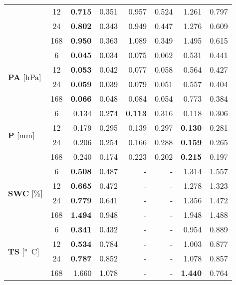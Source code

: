 \begin{table}
\begin{tabular}{p{2.1cm}c|rr|rr|rr}
 & 12 & \bfseries 0.715 & 0.351 & 0.957 & 0.524 & 1.261 & 0.797 \\
 & 24 & \bfseries 0.802 & 0.343 & 0.949 & 0.447 & 1.276 & 0.609 \\
 & 168 & \bfseries 0.950 & 0.363 & 1.089 & 0.349 & 1.495 & 0.615 \\
\cline{1-8}
\multirow[c]{4}{*}{{\textbf{PA} [\si{hPa}]}} & 6 & \bfseries 0.045 & 0.034 & 0.075 & 0.062 & 0.531 & 0.441 \\
 & 12 & \bfseries 0.053 & 0.042 & 0.077 & 0.058 & 0.564 & 0.427 \\
 & 24 & \bfseries 0.059 & 0.039 & 0.079 & 0.051 & 0.557 & 0.404 \\
 & 168 & \bfseries 0.066 & 0.048 & 0.084 & 0.054 & 0.773 & 0.384 \\
\cline{1-8}
\multirow[c]{4}{*}{{\textbf{P} [\si{mm}]}} & 6 & 0.134 & 0.274 & \bfseries 0.113 & 0.316 & 0.118 & 0.306 \\
 & 12 & 0.179 & 0.295 & 0.139 & 0.297 & \bfseries 0.130 & 0.281 \\
 & 24 & 0.206 & 0.254 & 0.166 & 0.288 & \bfseries 0.159 & 0.265 \\
 & 168 & 0.240 & 0.174 & 0.223 & 0.202 & \bfseries 0.215 & 0.197 \\
\cline{1-8}
\multirow[c]{4}{*}{{\textbf{SWC} [\si{\%}]}} & 6 & \bfseries 0.508 & 0.487 & - & - & 1.314 & 1.557 \\
 & 12 & \bfseries 0.665 & 0.472 & - & - & 1.278 & 1.323 \\
 & 24 & \bfseries 0.779 & 0.641 & - & - & 1.356 & 1.472 \\
 & 168 & \bfseries 1.494 & 0.948 & - & - & 1.948 & 1.488 \\
\cline{1-8}
\multirow[c]{4}{*}{{\textbf{TS} [\si{°C}]}} & 6 & \bfseries 0.341 & 0.432 & - & - & 0.954 & 0.889 \\
 & 12 & \bfseries 0.534 & 0.784 & - & - & 1.003 & 0.877 \\
 & 24 & \bfseries 0.787 & 0.852 & - & - & 1.078 & 0.857 \\
 & 168 & 1.660 & 1.078 & - & - & \bfseries 1.440 & 0.764 \\
\cline{1-8}
\bottomrule
\end{tabular}
\end{table}
